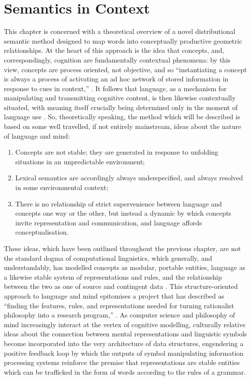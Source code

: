 \chapter{Semantics in Context} \label{chap:theory}
This chapter is concerned with a theoretical overview of a novel distributional semantic method designed to map words into conceptually productive geometric relationships.  At the heart of this approach is the idea that concepts, and, correspondingly, cognition are fundamentally contextual phenomena: by this view, concepts are process oriented, not objective, and so ``instantiating a concept is always a process of activating an ad hoc network of stored information in response to cues in context,'' \citep[][p. 546]{Casasanto2015}.  It follows that language, as a mechanism for manipulating and transmitting cognitive content, is then likewise contextually situated, with meaning itself crucially being determined only in the moment of language use \citep{Austin1962}.  So, theoretically speaking, the method which will be described is based on some well travelled, if not entirely mainstream, ideas about the nature of language and mind:

\begin{enumerate}
\item{Concepts are not stable; they are generated in response to unfolding situations in an unpredictable environment;}
\item{Lexical semantics are accordingly always underspecified, and always resolved in some environmental context;}
\item{There is no relationship of strict supervenience between language and concepts one way or the other, but instead a dynamic by which concepts invite representation and communication, and language affords conceptualisation.}
\end{enumerate}

These ideas, which have been outlined throughout the previous chapter, are not the standard dogma of computational linguistics, which generally, and understandably, has modelled concepts as modular, portable entities, language as a likewise stable system of representations and rules, and the relationship between the two as one of source and contingent data \citep[see, for instance, the textbook treatment in][particularly Ch. 17]{JurafskyEA2000}.  This structure-oriented approach to language and mind epitomises a project that \citeauthor{Dreyfus2012} has described as ``finding the features, rules, and representations needed for turning rationalist philosophy into a research program,'' \cite[][p. 89]{Dreyfus2012}.  As computer science and philosophy of mind increasingly interact at the vertex of cognitive modelling, culturally relative ideas about the connection between mental representations and linguistic symbols become incorporated into the very architecture of data structures, engendering a positive feedback loop by which the outputs of symbol manipulating information processing systems reinforce the premise that representations are stable entities which can be trafficked in the form of words according to the rules of a grammar.

